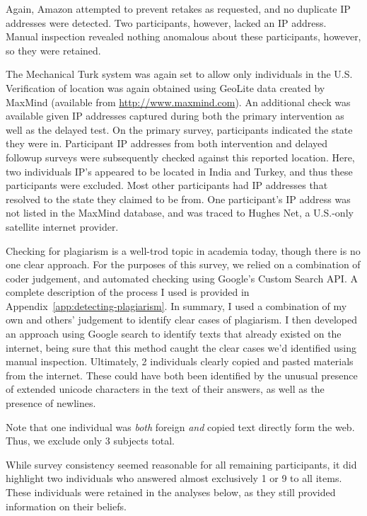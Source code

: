 Again, Amazon attempted to prevent retakes as requested, and no duplicate IP
addresses were detected. Two participants, however, lacked an IP address.
Manual inspection revealed nothing anomalous about these participants, however,
so they were retained.

The Mechanical Turk system was again set to allow only individuals in the U.S.
Verification of location was again obtained using GeoLite data created by
MaxMind (available from \url{http://www.maxmind.com}).  An additional check was
available given IP addresses captured during both the primary intervention as
well as the delayed test. On the primary survey, participants indicated the
state they were in.  Participant IP addresses from both intervention and
delayed followup surveys were subsequently checked against this reported location. Here,
two individuals IP’s appeared to be located in India and Turkey, and thus these
participants were excluded. Most other participants had IP addresses that
resolved to the state they claimed to be from. One participant’s IP address was
not listed in the MaxMind database, and was traced to Hughes Net, a U.S.-only
satellite internet provider.

Checking for plagiarism is a well-trod topic in academia today, though there is
no one clear approach. For the purposes of this survey, we relied on a
combination of coder judgement, and automated checking using Google’s Custom
Search API. A complete description of the process I used is provided in
Appendix~\ref{app:detecting-plagiarism}. In summary, I used a combination of my
own and others' judgement to identify clear cases of plagiarism. I then
developed an approach using Google search to identify texts that already existed
on the internet, being sure that this method caught the clear cases we’d
identified using manual inspection. Ultimately, 2 individuals clearly 
copied and pasted materials from the internet. These could have both been
identified by the unusual presence of extended unicode characters in the text of
their answers, as well as the presence of newlines.

Note that one individual was \emph{both} foreign \emph{and} copied text directly
form the web. Thus, we exclude only 3 subjects total.

While survey consistency seemed reasonable for all remaining participants, it
did highlight two individuals who answered almost exclusively 1 or 9 to all
items. These individuals were retained in the analyses below, as they still
provided information on their beliefs. 


